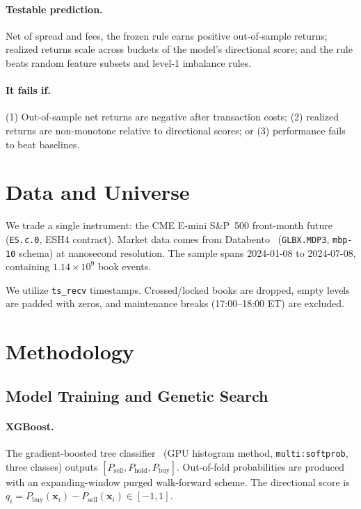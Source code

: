 \documentclass[11pt,letterpaper]{article}
\begin{document}
\paragraph{Testable prediction.} Net of spread and fees, the frozen rule earns positive out-of-sample returns; realized returns scale across buckets of the model's directional score; and the rule beats random feature subsets and level-1 imbalance rules.
 
\paragraph{It fails if.} (1) Out-of-sample net returns are negative after transaction costs; (2) realized returns are non-monotone relative to directional scores; or (3) performance fails to beat baselines.
 
\section{Data and Universe}
We trade a single instrument: the CME E-mini S\&P~500 front-month future (\texttt{ES.c.0}, ESH4 contract). Market data comes from Databento~\cite{Databento} (\texttt{GLBX.MDP3}, \texttt{mbp-10} schema) at nanosecond resolution. The sample spans 2024-01-08 to 2024-07-08, containing $1.14\times10^{9}$ book events. 

We utilize \texttt{ts\_recv} timestamps. Crossed/locked books are dropped, empty levels are padded with zeros, and maintenance breaks (17:00--18:00 ET) are excluded.
 
\section{Methodology}
\subsection{Model Training and Genetic Search}
\paragraph{XGBoost.} The gradient-boosted tree classifier~\cite{chen2016xgboost}
(GPU histogram method, \texttt{multi:softprob}, three classes) outputs
$[P_{\text{sell}},P_{\text{hold}},P_{\text{buy}}]$. Out-of-fold probabilities are produced with an expanding-window purged walk-forward scheme. The directional score is $q_i = P_{\text{buy}}(\mathbf{x}_i) - P_{\text{sell}}(\mathbf{x}_i) \in [-1,1]$.
 
\end{document}
